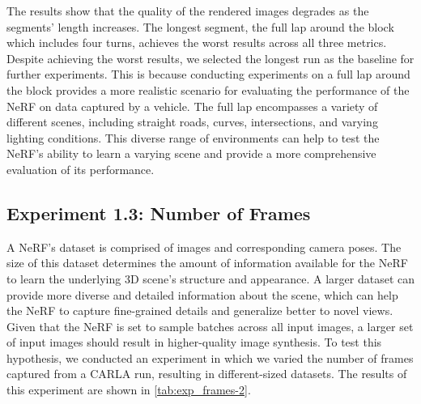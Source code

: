 The results show that the quality of the rendered images degrades as the segments’ length increases. The longest segment, the full lap around the block which includes four turns, achieves the worst results across all three metrics. Despite achieving the worst results, we selected the longest run as the baseline for further experiments. This is because conducting experiments on a full lap around the block provides a more realistic scenario for evaluating the performance of the NeRF on data captured by a vehicle. The full lap encompasses a variety of different scenes, including straight roads, curves, intersections, and varying lighting conditions. This diverse range of environments can help to test the NeRF’s ability to learn a varying scene and provide a more comprehensive evaluation of its performance.












\subsection{Experiment 1.3: Number of Frames} \label{sec:exp-number-of-frames}
A NeRF's dataset is comprised of images and corresponding camera poses. The size of this dataset determines the amount of information available for the NeRF to learn the underlying 3D scene's structure and appearance. A larger dataset can provide more diverse and detailed information about the scene, which can help the NeRF to capture fine-grained details and generalize better to novel views. Given that the NeRF is set to sample batches across all input images, a larger set of input images should result in higher-quality image synthesis. To test this hypothesis, we conducted an experiment in which we varied the number of frames captured from a CARLA run, resulting in different-sized datasets. The results of this experiment are shown in \autoref{tab:exp_frames-2}.

